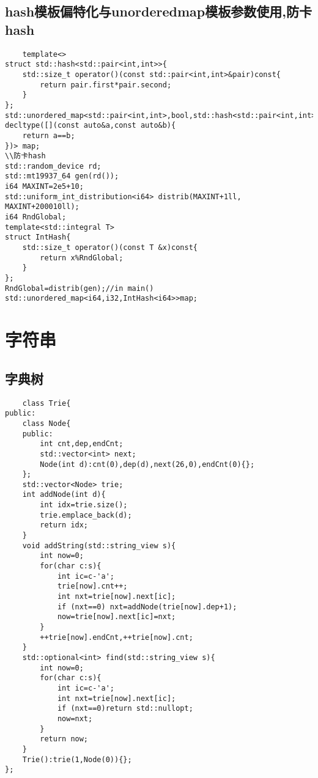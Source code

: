 \documentclass[UTF8]{ctexart}
\begin{document}
\subsection{hash模板偏特化与unorderedmap模板参数使用,防卡hash}
\begin{lstlisting}
    template<>
struct std::hash<std::pair<int,int>>{
    std::size_t operator()(const std::pair<int,int>&pair)const{
        return pair.first*pair.second;
    }
};
std::unordered_map<std::pair<int,int>,bool,std::hash<std::pair<int,int>>, decltype([](const auto&a,const auto&b){
    return a==b;
})> map;
\\防卡hash
std::random_device rd;
std::mt19937_64 gen(rd());
i64 MAXINT=2e5+10;
std::uniform_int_distribution<i64> distrib(MAXINT+1ll, MAXINT+200010ll);
i64 RndGlobal;
template<std::integral T>
struct IntHash{
    std::size_t operator()(const T &x)const{
        return x%RndGlobal;
    }
};
RndGlobal=distrib(gen);//in main()
std::unordered_map<i64,i32,IntHash<i64>>map;
\end{lstlisting}
\section{字符串}
\subsection{字典树}
\begin{lstlisting}
    class Trie{
public:
    class Node{
    public:
        int cnt,dep,endCnt;
        std::vector<int> next;
        Node(int d):cnt(0),dep(d),next(26,0),endCnt(0){};
    };
    std::vector<Node> trie;
    int addNode(int d){
        int idx=trie.size();
        trie.emplace_back(d);
        return idx;
    }
    void addString(std::string_view s){
        int now=0;
        for(char c:s){
            int ic=c-'a';
            trie[now].cnt++;
            int nxt=trie[now].next[ic];
            if (nxt==0) nxt=addNode(trie[now].dep+1);
            now=trie[now].next[ic]=nxt;
        }
        ++trie[now].endCnt,++trie[now].cnt;
    }
    std::optional<int> find(std::string_view s){
        int now=0;
        for(char c:s){
            int ic=c-'a';
            int nxt=trie[now].next[ic];
            if (nxt==0)return std::nullopt;
            now=nxt;
        }
        return now;
    }
    Trie():trie(1,Node(0)){};
};
\end{lstlisting}
\end{document}
